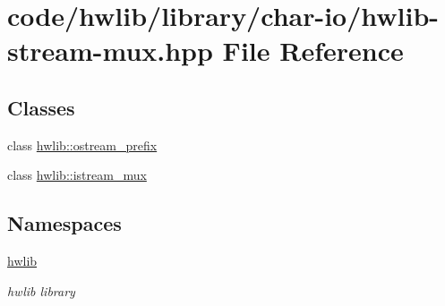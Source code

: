 \hypertarget{hwlib-stream-mux_8hpp}{}\section{code/hwlib/library/char-\/io/hwlib-\/stream-\/mux.hpp File Reference}
\label{hwlib-stream-mux_8hpp}
\subsection*{Classes}
\begin{DoxyCompactItemize}
\item 
class \hyperlink{classhwlib_1_1ostream__prefix}{hwlib\+::ostream\+\_\+prefix}
\item 
class \hyperlink{classhwlib_1_1istream__mux}{hwlib\+::istream\+\_\+mux}
\end{DoxyCompactItemize}
\subsection*{Namespaces}
\begin{DoxyCompactItemize}
\item 
 \hyperlink{namespacehwlib}{hwlib}
\begin{DoxyCompactList}\small\item\em hwlib library \end{DoxyCompactList}\end{DoxyCompactItemize}
